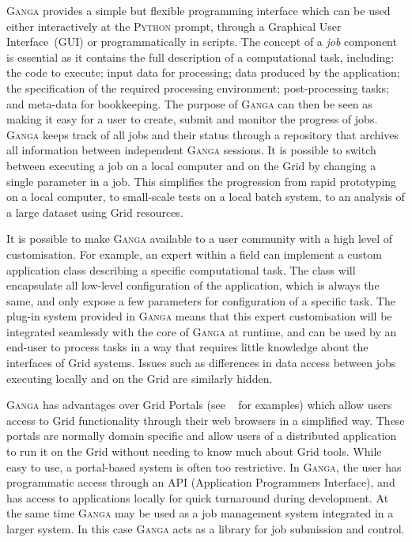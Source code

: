 \documentclass{elsart}
\def\ganga {\textsc{Ganga}\xspace}
\def\python {\textsc{Python}\xspace}
\def\grid {Grid\xspace}
\begin{document}
\ganga provides a simple but flexible programming interface which can
be used either interactively at the \python prompt, through a
Graphical User Interface~(GUI) or programmatically in scripts. The
concept of a \emph{job} component is essential as it contains the full
description of a computational task, including: the code to execute;
input data for processing; data produced by the application; the
specification of the required processing environment; post-processing
tasks; and meta-data for bookkeeping.  The purpose of \ganga can then
be seen as making it easy for a user to create, submit and monitor the
progress of jobs. \ganga keeps track of all jobs and their status
through a repository that archives all information between independent
\ganga sessions. It is possible to switch between executing a job on a
local computer and on the \grid by changing a single parameter in a
job. This simplifies the progression from rapid prototyping on a local
computer, to small-scale tests on a local batch system, to an analysis of a
large dataset using \grid resources.

It is possible to make \ganga available to a user community with a high level
of customisation. For example, an expert within a field can implement a custom
application class describing a specific computational task. The class will
encapsulate all low-level configuration of the application, which is always
the same, and only expose a few parameters for configuration of a specific
task. The plug-in system provided in \ganga means that this expert
customisation will be integrated seamlessly with the core of \ganga at runtime,
and can be used by an end-user to process tasks in a way that requires
little knowledge about the interfaces of \grid systems. Issues such as
differences in data access between jobs executing locally and on the
\grid are similarly hidden.

\ganga has advantages over \grid Portals (see ~\cite{AHE,LEAD} for
examples) which allow users access to \grid functionality through
their web browsers in a simplified way. These portals are normally
domain specific and allow users of a distributed application to run it
on the \grid without needing to know much about \grid tools. While
easy to use, a portal-based system is often too restrictive.  In
\ganga, the user has programmatic access through an API (Application
Programmers Interface), and has access to applications locally for
quick turnaround during development. At the same time \ganga may be
used as a job management system integrated in a larger system. In this
case \ganga acts as a library for job submission and control.
\end{document}
